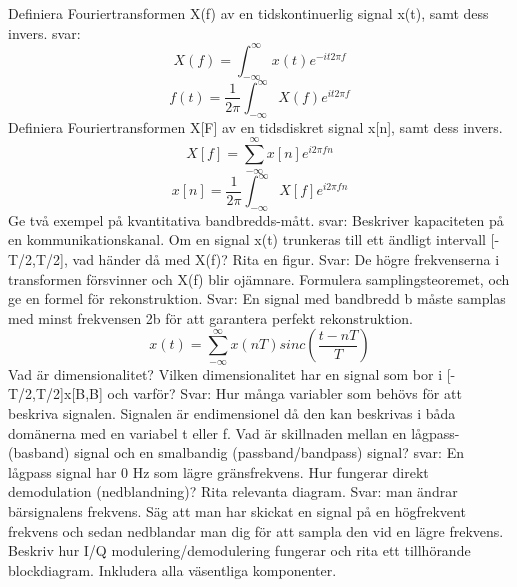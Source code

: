 \documentclass[a4paper,11pt]{article}
\begin{document}
\newline
Definiera Fouriertransformen X(f) av en tidskontinuerlig signal x(t), samt dess invers.
svar: $$X(f)=\int_{-\infty}^{\infty}x(t)e^{-it2\pi f}$$
$$f(t)=\frac{1}{2 \pi}\int_{-\infty}^{\infty}X(f)e^{it2\pi f}$$
\newline
\newline
Definiera Fouriertransformen X[F] av en tidsdiskret signal x[n], samt dess invers.
$$X[f]=\sum_{-\infty}^{\infty}x[n]e^{i2\pi f n}$$
$$x[n]=\frac{1}{2\pi}\int_{-\infty}^{\infty}X[f]e^{i2\pi f n}$$
\newline
\newline
Ge två exempel på kvantitativa bandbredds-mått.
svar: Beskriver kapaciteten på en kommunikationskanal. 
\newline
\newline
Om en signal x(t) trunkeras till ett ändligt intervall [-T/2,T/2], vad händer då med X(f)? Rita en figur. Svar: De högre frekvenserna i transformen försvinner och X(f) blir ojämnare. 
\newline
\newline
Formulera samplingsteoremet, och ge en formel för rekonstruktion.
Svar: En signal med bandbredd b måste samplas med minst frekvensen 2b för att garantera perfekt rekonstruktion. 
$$x(t)=\sum_{-\infty}^{\infty}x(nT)sinc(\frac{t-nT}{T})$$
\newline
\newline
Vad är dimensionalitet?  Vilken dimensionalitet har en signal som bor i [-T/2,T/2]x[B,B] 
och varför? Svar: Hur många variabler som behövs för att beskriva signalen. Signalen är endimensionel då den kan beskrivas i båda domänerna med en variabel t eller f.
\newline
\newline
Vad är skillnaden mellan en lågpass- (basband) signal och en smalbandig 
(passband/bandpass) signal? svar: En lågpass signal har 0 Hz som lägre gränsfrekvens.
\newline
\newline
Hur fungerar direkt demodulation (nedblandning)? Rita relevanta diagram.
Svar: man ändrar bärsignalens frekvens. Säg att man har skickat en signal på en högfrekvent frekvens och sedan nedblandar man dig för att sampla den vid en lägre frekvens. 
\newline
\newline
Beskriv hur I/Q modulering/demodulering fungerar och rita ett tillhörande blockdiagram. 
Inkludera alla väsentliga komponenter.
\newline
\end{document}
